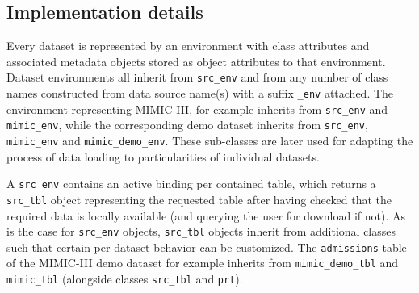 \documentclass[
  notitle]{jss}
\begin{document}
\hypertarget{implementation-details}{%
\subsection{Implementation details}\label{implementation-details}}

Every dataset is represented by an environment with class attributes and
associated metadata objects stored as object attributes to that
environment. Dataset environments all inherit from \texttt{src\_env} and
from any number of class names constructed from data source name(s) with
a suffix \texttt{\_env} attached. The environment representing
MIMIC-III, for example inherits from \texttt{src\_env} and
\texttt{mimic\_env}, while the corresponding demo dataset inherits from
\texttt{src\_env}, \texttt{mimic\_env} and \texttt{mimic\_demo\_env}.
These sub-classes are later used for adapting the process of data
loading to particularities of individual datasets.

A \texttt{src\_env} contains an active binding per contained table,
which returns a \texttt{src\_tbl} object representing the requested
table after having checked that the required data is locally available
(and querying the user for download if not). As is the case for
\texttt{src\_env} objects, \texttt{src\_tbl} objects inherit from
additional classes such that certain per-dataset behavior can be
customized. The \texttt{admissions} table of the MIMIC-III demo dataset
for example inherits from \texttt{mimic\_demo\_tbl} and
\texttt{mimic\_tbl} (alongside classes \texttt{src\_tbl} and
\texttt{prt}).
\end{document}

